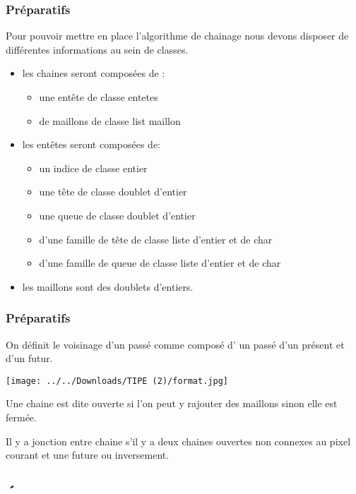 \documentclass{beamer}
\begin{document}
\begin{frame}
\frametitle{Préparatifs}

Pour pouvoir mettre en place l'algorithme de chainage nous devons disposer de différentes informations au sein de classes.
\begin{itemize}
\item <1> les chaines seront composées de :
\begin{itemize}
\item une entête de classe entetes
\item de maillons de classe list maillon
\end{itemize}
\item <2> les entêtes seront composées de:
\begin{itemize}
\item un indice de classe entier
\item une tête de classe doublet d'entier
\item une queue de classe doublet d'entier
\item d'une famille de tête de classe liste d'entier et de char
\item d'une famille de queue de classe liste d'entier et de char
\end{itemize}

\item <2>les maillons sont des doublets d'entiers.
\end{itemize}
\end{frame}

\begin{frame}
\frametitle{Préparatifs}

On définit le voisinage d'un passé comme composé d' un passé d'un présent et d'un futur.
\begin{center}
\texttt{[image: ../../Downloads/TIPE (2)/format.jpg]}
\end{center}
Une chaine est dite ouverte si l'on peut y rajouter des maillons sinon elle est fermée.

Il y a jonction entre chaine s'il y a deux chaines ouvertes non connexes au pixel courant et  une future ou inversement.
\end{frame}

\subsection{Étape 1: Création}
\begin{frame}
\frametitle{Création}

Pour pouvoir créer les chaines de contours on doit connaitre le nombre de chaines ouvertes/fermées dans le passé (NCO NCF) et le nombre de pixels contour dans le futur(NPF) du pixel courant.
\end{frame}
\end{document}
